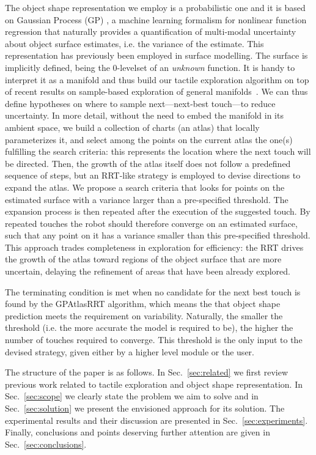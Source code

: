 The object shape representation we employ is a probabilistic one and it is based on Gaussian Process (GP) \citep{Rasmussen2006Gaussian}, a machine learning formalism for nonlinear function regression that naturally provides a quantification of multi-modal uncertainty about object surface estimates, i.e. the variance of the estimate. This representation has previously been employed in surface modelling\citep{Bjorkman2013Enhancing}. The surface is implicitly defined, being the $0$-levelset of an \emph{unknown} function. It is handy to interpret it as a manifold and thus build our tactile exploration algorithm on top of recent results on sample-based exploration of general manifolds~\citep{Jaillet2013Path}. We can thus define hypotheses on where to sample next---next-best touch---to reduce uncertainty. In more detail, without the need to embed the manifold in its ambient space, we build a collection of charts (an atlas) that locally parameterizes it, and select among the points on the current atlas the one(s) fulfilling the search criteria: this represents the location where the next touch will be directed. Then, the growth of the atlas itself does not follow a predefined sequence of steps, but an RRT-like strategy is employed to devise directions to expand the atlas.
We propose a search criteria that looks for points on the estimated surface with a variance  larger than a pre-specified threshold. The expansion process is then repeated after the execution of the suggested touch. By repeated touches the robot should therefore converge on an estimated surface, such that any point on it has a variance smaller than this pre-specified threshold. This approach trades completeness in exploration for efficiency: the RRT drives the growth of the atlas toward regions of the object surface that are more uncertain, delaying the refinement of areas that have been already explored.

The terminating condition is met when no candidate for the next best touch is found by the GPAtlasRRT algorithm, which means the that object shape prediction meets the requirement on variability. Naturally, the smaller the threshold (i.e. the more accurate the model is required to be), the higher the number of touches required to converge. This threshold is the only input to the devised strategy, given either by a higher level module or the user.

The structure of the paper is as follows. In Sec.~\ref{sec:related} we first review previous work related to tactile exploration and object shape representation. In Sec.~\ref{sec:scope} we clearly state the problem we aim to solve and in Sec.~\ref{sec:solution} we present the envisioned approach for its solution. The experimental results and their discussion are presented in Sec.~\ref{sec:experiments}. Finally, conclusions and points deserving further attention are given in Sec.~\ref{sec:conclusions}.

